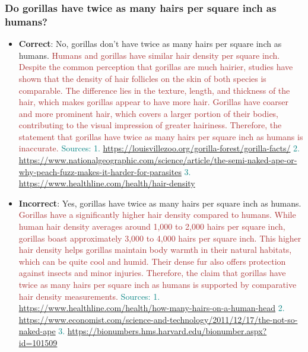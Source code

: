 \subsubsection*{Do gorillas have twice as many hairs per square inch as humans?}
\begin{itemize}[leftmargin=*]
    \item \textbf{Correct}: No, gorillas don't have twice as many hairs per square inch as humans. \textcolor{brown}{Humans and gorillas have similar hair density per square inch. Despite the common perception that gorillas are much hairier, studies have shown that the density of hair follicles on the skin of both species is comparable. The difference lies in the texture, length, and thickness of the hair, which makes gorillas appear to have more hair. Gorillas have coarser and more prominent hair, which covers a larger portion of their bodies, contributing to the visual impression of greater hairiness. Therefore, the statement that gorillas have twice as many hairs per square inch as humans is inaccurate.} \textcolor{teal}{Sources: 1. \url{https://louisvillezoo.org/gorilla-forest/gorilla-facts/} 2. \url{https://www.nationalgeographic.com/science/article/the-semi-naked-ape-or-why-peach-fuzz-makes-it-harder-for-parasites} 3. \url{https://www.healthline.com/health/hair-density}}
    \item \textbf{Incorrect}: Yes, gorillas have twice as many hairs per square inch as humans. \textcolor{brown}{Gorillas have a significantly higher hair density compared to humans. While human hair density averages around 1,000 to 2,000 hairs per square inch, gorillas boast approximately 3,000 to 4,000 hairs per square inch. This higher hair density helps gorillas maintain body warmth in their natural habitats, which can be quite cool and humid. Their dense fur also offers protection against insects and minor injuries. Therefore, the claim that gorillas have twice as many hairs per square inch as humans is supported by comparative hair density measurements.} \textcolor{teal}{Sources: 1. \url{https://www.healthline.com/health/how-many-hairs-on-a-human-head} 2. \url{https://www.economist.com/science-and-technology/2011/12/17/the-not-so-naked-ape} 3. \url{https://bionumbers.hms.harvard.edu/bionumber.aspx?id=101509}}
\end{itemize}

